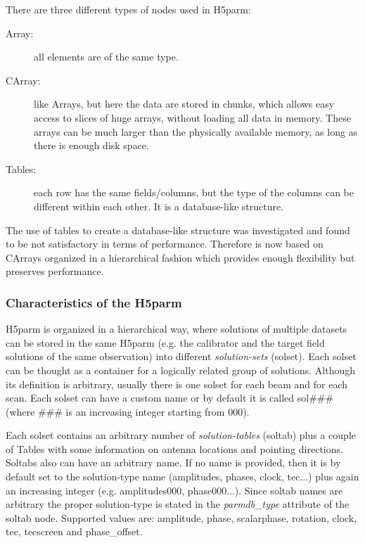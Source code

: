 \documentclass[]{article}
\begin{document}
There are three different types of nodes used in H5parm:
\begin{description}
 \item[Array:] all elements are of the same type.
 \item[CArray:] like Arrays, but here the data are stored in chunks, which allows easy access to
slices of huge arrays, without loading all data in memory. These arrays can be much
larger than the physically available memory, as long as there is enough disk space.
 \item[Tables:] each row has the same fields/columns, but the type of the columns can be different within each other. It is a database-like structure.
\end{description}

The use of tables to create a database-like structure was investigated and found to be not satisfactory in terms of performance. Therefore \losoto{} is now based on CArrays organized in a hierarchical fashion which provides enough flexibility but preserves performance.

\subsubsection{Characteristics of the H5parm}
\label{losoto:characteristics_h5parm}

H5parm is organized in a hierarchical way, where solutions of multiple datasets can be stored in the same H5parm (e.g. the calibrator and the target field solutions of the same observation) into different \textit{solution-sets} (solset). Each solset can be thought as a container for a logically related group of solutions. Although its definition is arbitrary, usually there is one solset for each beam and for each scan. Each solset can have a custom name or by default it is called sol\#\#\# (where \#\#\# is an increasing integer starting from 000).

Each solset contains an arbitrary number of \textit{solution-tables} (soltab) plus a couple of Tables with some information on antenna locations and pointing directions. Soltabs also can have an arbitrary name. If no name is provided, then it is by default set to the solution-type name (amplitudes, phases, clock, tec...) plus again an increasing integer (e.g. amplitudes000, phase000...). Since soltab names are arbitrary the proper solution-type is stated in the \textit{parmdb\_type} attribute of the soltab node. Supported values are: amplitude, phase, scalarphase, rotation, clock, tec, tecscreen and phase\_offset.
\end{document}
